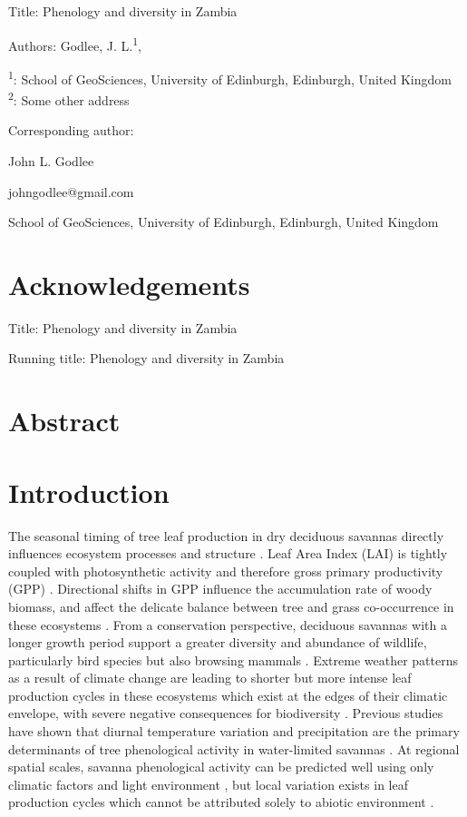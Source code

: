\documentclass[11pt,a4paper]{article}
\newcommand{\titletext}{Phenology and diversity in Zambia}
\begin{document}
{\LARGE{Title: \titletext}}

\vspace{1cm}

Authors: Godlee, J. L.\textsuperscript{1}, 

\textsuperscript{1}: School of GeoSciences, University of Edinburgh, Edinburgh, United Kingdom \\
\textsuperscript{2}: Some other address

\vspace{1em}
Corresponding author:

John L. Godlee

johngodlee@gmail.com

School of GeoSciences, University of Edinburgh, Edinburgh, United Kingdom

\section{Acknowledgements}

\newpage{}


\LARGE{Title: \titletext}

\normalsize{Running title: \titletext}

\section{Abstract}

\section{Introduction}

The seasonal timing of tree leaf production in dry deciduous savannas directly influences ecosystem processes and structure \citep{}. Leaf Area Index (LAI) is tightly coupled with photosynthetic activity and therefore gross primary productivity (GPP) \citep{}. Directional shifts in GPP influence the accumulation rate of woody biomass, and affect the delicate balance between tree and grass co-occurrence in these ecosystems \citep{}. From a conservation perspective, deciduous savannas with a longer growth period support a greater diversity and abundance of wildlife, particularly bird species but also browsing mammals \citep{}. Extreme weather patterns as a result of climate change are leading to shorter but more intense leaf production cycles in these ecosystems which exist at the edges of their climatic envelope, with severe negative consequences for biodiversity \citep{}. Previous studies have shown that diurnal temperature variation and precipitation are the primary determinants of tree phenological activity in water-limited savannas \citep{}. At regional spatial scales, savanna phenological activity can be predicted well using only climatic factors and light environment \citep{Adole2018}, but local variation exists in leaf production cycles which cannot be attributed solely to abiotic environment \citep{}. 
\end{document}
